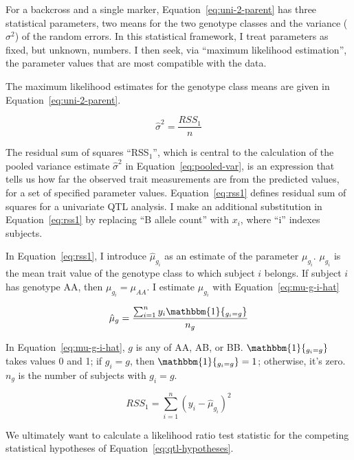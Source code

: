\documentclass[oneside]{book}\usepackage[]{graphicx}\usepackage[]{color}
\begin{document}
For a backcross and a single marker, Equation~\ref{eq:uni-2-parent} has three statistical 
parameters, two means for the two genotype classes and the variance ($\sigma^2$) of the random errors. In this 
statistical framework, I treat parameters as fixed, but unknown, numbers. I then 
seek, via ``maximum likelihood estimation'', the parameter values that are most compatible with the data.

The maximum likelihood estimates for the genotype class means are given in Equation~\ref{eq:uni-2-parent}.




\begin{equation}
\widehat\sigma^2 = \frac{RSS_1}{n}
\label{eq:pooled-var}
\end{equation}

The residual sum of squares ``RSS$_1$'', which is central to the
calculation of the pooled variance estimate $\widehat\sigma^2$ in Equation~\ref{eq:pooled-var}, is an expression that
tells us how far the observed trait measurements are
from the predicted values, for a
set of specified parameter values. Equation~\ref{eq:rss1} defines residual
sum of squares for a univariate QTL analysis. I make an additional substitution in 
Equation~\ref{eq:rss1} by replacing ``B allele count'' with $x_i$, where ``i'' indexes subjects. 

In 
Equation~\ref{eq:rss1}, I introduce $\hat\mu_{g_i}$ as an estimate of the parameter 
$\mu_{g_i}$. $\mu_{g_i}$ is the mean trait value of the genotype class to which subject 
$i$ belongs. If subject $i$ has genotype AA, then $\mu_{g_i} = \mu_{AA}$. I estimate 
$\mu_{g_i}$ with Equation~\ref{eq:mu-g-i-hat}

\begin{equation}
\hat\mu_{g} = \frac{\sum_{i = 1}^ny_i\mathbbm{1}{_{g_i = g}}}{n_{g}}
\label{eq:mu-g-i-hat}
\end{equation}

In Equation~\ref{eq:mu-g-i-hat}, $g$ is any of AA, AB, or BB. $\mathbbm{1}{_{g_i = g}}$ 
takes values 0 and 1; if $g_i = g$, then $\mathbbm{1}{_{g_i = g}} = 1$; otherwise, it's zero.
$n_g$ is the number of subjects with $g_i = g$. 

\begin{equation}
RSS_1 = \sum_{i=1}^n(y_i - \hat\mu_{g_i})^2
\label{eq:rss1}
\end{equation}

We ultimately want to calculate a likelihood ratio test statistic
for the competing statistical hypotheses of Equation~\ref{eq:qtl-hypotheses}.
\end{document}
